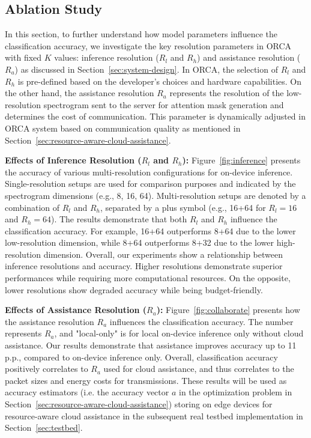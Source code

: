 \subsection{Ablation Study}
\label{sec:sensitivity-analysis}
In this section, to further understand how model parameters influence the classification accuracy, we investigate the key resolution parameters in ORCA with fixed $K$ values: inference resolution ($R_l$ and $R_h$) and assistance resolution ($R_a$) as discussed in Section~\ref{sec:system-design}. In ORCA, the selection of $R_l$ and $R_h$ is pre-defined based on the developer's choices and hardware capabilities. On the other hand, the assistance resolution $R_a$ represents the resolution of the low-resolution spectrogram sent to the server for attention mask generation and determines the cost of communication. This parameter is dynamically adjusted in ORCA system based on communication quality as mentioned in Section~\ref{sec:resource-aware-cloud-assistance}. 


\noindent
\textbf{Effects of Inference Resolution ($R_l$ and $R_h$):} 
Figure~\ref{fig:inference} presents the accuracy of various multi-resolution configurations for on-device inference. Single-resolution setups are used for comparison purposes and indicated by the spectrogram dimensions (e.g., 8, 16, 64). Multi-resolution setups are denoted by a combination of $R_l$ and $R_h$, separated by a plus symbol (e.g., 16+64 for $R_l=16$ and $R_h=64$).
The results demonstrate that both $R_l$ and $R_h$ influence the classification accuracy. For example, 16+64 outperforms 8+64 due to the lower low-resolution dimension, while 8+64 outperforms 8+32 due to the lower high-resolution dimension. Overall, our experiments show a relationship between inference resolutions and accuracy. Higher resolutions demonstrate superior performances while requiring more computational resources. On the opposite, lower resolutions show degraded accuracy while being budget-friendly. 



\noindent
\textbf{Effects of Assistance Resolution ($R_a$):} 
Figure~\ref{fig:collaborate} presents how the assistance resolution $R_a$ influences the classification accuracy. The number represents $R_a$, and "local-only" is for local on-device inference only without cloud assistance. Our results demonstrate that assistance improves accuracy up to 11 p.p., compared to on-device inference only. Overall, classification accuracy positively correlates to $R_a$ used for cloud assistance, and thus correlates to the packet sizes and energy costs for transmissions. These results will be used as accuracy estimators (i.e. the accuracy vector $a$ in the optimization problem in Section~\ref{sec:resource-aware-cloud-assistance}) storing on edge devices for resource-aware cloud assistance in the subsequent real testbed implementation in Section~\ref{sec:testbed}.
